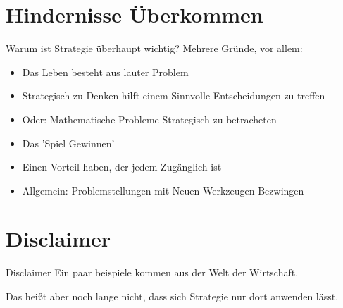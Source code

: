 


\section{Hindernisse Überkommen}

\begin{frame}[c]{Warum ist Strategie überhaupt wichtig?}
    Mehrere Gründe, vor allem: \\
    \pause
    \begin{itemize}
        \item Das Leben besteht aus lauter Problem
            \pause
        \item Strategisch zu Denken hilft einem Sinnvolle Entscheidungen zu treffen
            \pause
        \item Oder: Mathematische Probleme Strategisch zu betracheten
            \pause
        \item Das 'Spiel Gewinnen'
            \pause
        \item Einen Vorteil haben, der jedem Zugänglich ist
            \pause
        \item Allgemein: Problemstellungen mit Neuen Werkzeugen Bezwingen
    \end{itemize}
\end{frame}


\section{Disclaimer}
\begin{frame}[c]{Disclaimer}
    Ein paar beispiele kommen aus der Welt der Wirtschaft. \\ \pause

    \vfill

    Das heißt aber noch lange nicht, dass sich Strategie nur dort anwenden lässt.
\end{frame}



